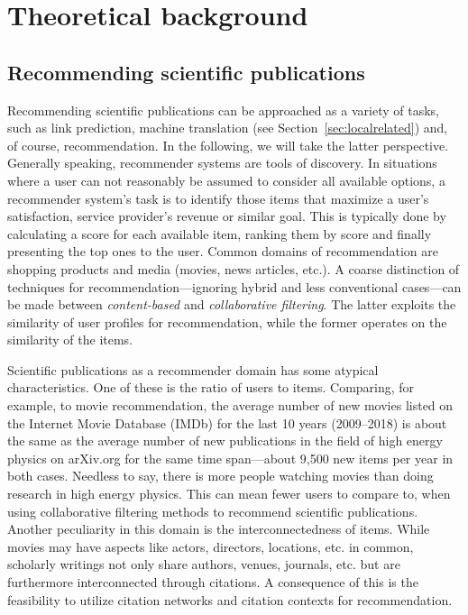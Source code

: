 \section{Theoretical background}
\subsection{Recommending scientific publications}
Recommending scientific publications can be approached as a variety of tasks, such as link prediction, machine translation (see Section~\ref{sec:localrelated}) and, of course, recommendation. In the following, we will take the latter perspective. Generally speaking, recommender systems are tools of discovery. In situations where a user can not reasonably be assumed to consider all available options, a recommender system's task is to identify those items that maximize a user's satisfaction, service provider's revenue or similar goal. This is typically done by calculating a score for each available item, ranking them by score and finally presenting the top ones to the user. Common domains of recommendation are shopping products and media (movies, news articles, etc.). A coarse distinction of techniques for recommendation---ignoring hybrid and less conventional cases---can be made between \emph{content-based} and \emph{collaborative filtering}. The latter exploits the similarity of user profiles for recommendation, while the former operates on the similarity of the items.~\cite{Ricci2015}

Scientific publications as a recommender domain has some atypical characteristics. One of these is the ratio of users to items. Comparing, for example, to movie recommendation, the average number of new movies listed on the Internet Movie Database (IMDb) for the last 10 years (2009--2018) is about the same as the average number of new publications in the field of high energy physics on arXiv.org for the same time span---about 9,500 new items per year in both cases. Needless to say, there is more people watching movies than doing research in high energy physics. This can mean fewer users to compare to, when using collaborative filtering methods to recommend scientific publications. Another peculiarity in this domain is the interconnectedness of items. While movies may have aspects like actors, directors, locations, etc. in common, scholarly writings not only share authors, venues, journals, etc. but are furthermore interconnected through citations. A consequence of this is the feasibility to utilize citation networks and citation contexts for recommendation.

